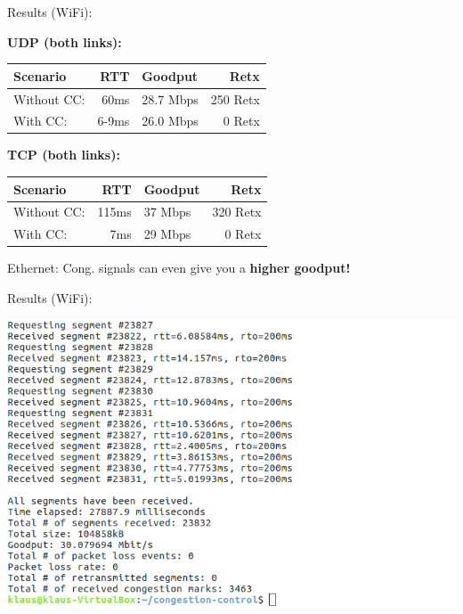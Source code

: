 \begin{frame}{Results (WiFi):}

\textbf{UDP (both links):}\\[.3em]
\begin{tabular}{ l r l r }
\toprule
\textbf{Scenario} & \textbf{RTT}	& \textbf{Goodput} & \textbf{Retx} \\
\midrule
Without CC: & 60ms 	& 28.7 Mbps	 & 250 Retx \\
With CC: & 6-9ms 		& 26.0 Mbps		 & 0 Retx \\
\bottomrule
\end{tabular}

\pause
\vspace*{1em}

\textbf{TCP (both links):}\\[.3em]
\begin{tabular}{ l r l r }
\toprule
\textbf{Scenario} & \textbf{RTT}	& \textbf{Goodput} & \textbf{Retx} \\
\midrule
Without CC: & 115ms 	& 37 Mbps	 & 320 Retx \\
With CC: 		& 	7ms  	& 29 Mbps	 & 0 Retx \\
\bottomrule
\end{tabular}

\vspace*{1em}

\pause
Ethernet: Cong. signals can even give you a \textbf{higher goodput!}

\end{frame}


\begin{frame}{Results (WiFi):}

\includegraphics[width=\linewidth]{../results/screenshots.png}

\end{frame}




